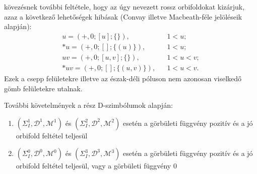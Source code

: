 \begin{frame}
\begin{itemize}
{      kövezésnek további feltétele, hogy az úgy nevezett  rossz orbifoldokat
      kizárjuk, azaz a következő lehetőségek hibásak (Convay illetve
      Macbeath-féle jelöléseik alapján):
      \begin{align*}
	u=(+,0;[u];\{\}), & & 1<u;\\
	*u=(+,0;[];\{(u)\}), & & 1<u;\\
	uv=(+,0;[u,v];\{\}), & & 1<u<v;\\
	*uv=(+,0;[];\{(u,v)\}), & & 1<u<v.
      \end{align*}
      Ezek a csepp felületekre illetve az észak-déli póluson nem azonosan viselkedő
      gömb felületekre utalnak.}
  \end{itemize}
\end{frame}

\begin{frame}
  További követelmények a rész D-szimbólumok alapján:
  \begin{enumerate}
    \item $(\Sigma_I^1,\mathcal{D}^1,\mathcal{M}^1)$ és
      $(\Sigma_I^2,\mathcal{D}^2,\mathcal{M}^2)$ esetén a
      görbületi függvény pozitív és a jó orbifold feltétel
      teljesül
    \item $(\Sigma_I^0,\mathcal{D}^0,\mathcal{M}^0)$ és
      $(\Sigma_I^3,\mathcal{D}^3,\mathcal{M}^3)$ esetén a görbületi függvény
      pozitív és a jó orbifold feltétel teljesül, vagy a görbületi függvény
      $0$
  \end{enumerate}
\end{frame}



